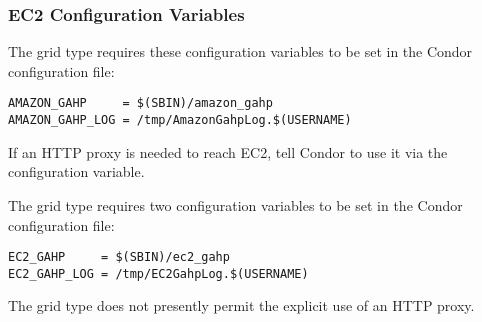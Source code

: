 \subsubsection{\label{sec:Amazon-config}EC2 Configuration Variables}

The  grid type requires these configuration variables 
to be set in the Condor configuration file:

\footnotesize
\begin{verbatim}
AMAZON_GAHP     = $(SBIN)/amazon_gahp
AMAZON_GAHP_LOG = /tmp/AmazonGahpLog.$(USERNAME)
\end{verbatim}
\normalsize

If an HTTP proxy is needed to reach EC2, tell Condor to use it
via the  configuration variable.

The  grid type requires two configuration variables to be
set in the Condor configuration file:

\footnotesize
\begin{verbatim}
EC2_GAHP     = $(SBIN)/ec2_gahp
EC2_GAHP_LOG = /tmp/EC2GahpLog.$(USERNAME)
\end{verbatim}
\normalsize

The  grid type does not presently permit the explicit use 
of an HTTP proxy.
